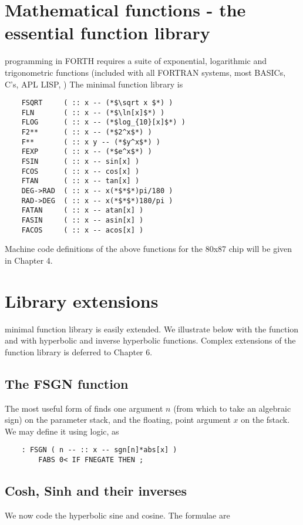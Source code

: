 \section{Mathematical functions - the essential function library}

programming in FORTH requires a suite of exponential, logarithmic and trigonometric functions (included with all FORTRAN systems, most BASICs, C's, APL LISP, \etc) The minimal function library is

\begin{lstlisting}
    FSQRT     ( :: x -- (*$\sqrt x $*) )
    FLN       ( :: x -- (*$\ln[x]$*) )
    FLOG      ( :: x -- (*$log_{10}[x]$*) )
    F2**      ( :: x -- (*$2^x$*) )
    F**       ( :: x y -- (*$y^x$*) )
    FEXP      ( :: x -- (*$e^x$*) )
    FSIN      ( :: x -- sin[x] )
    FCOS      ( :: x -- cos[x] )
    FTAN      ( :: x -- tan[x] )
    DEG->RAD  ( :: x -- x(*$*$*)pi/180 )
    RAD->DEG  ( :: x -- x(*$*$*)180/pi )
    FATAN     ( :: x -- atan[x] )
    FASIN     ( :: x -- asin[x] )
    FACOS     ( :: x -- acos[x] )
\end{lstlisting}

Machine code definitions of the above functions for the 80x87
chip will be given in Chapter 4.

\section{Library extensions}

minimal function library is easily extended. We illustrate
below with the  function and with hyperbolic and inverse hyperbolic
functions. Complex extensions of the function
library is deferred to Chapter 6.

\subsection{The FSGN function}
The most useful form of  finds one argument $n$ (from which
to take an algebraic sign) on the parameter stack, and the floating,
point argument $x$ on the fstack. We may define it using logic, as

\begin{lstlisting}
    : FSGN ( n -- :: x -- sgn[n]*abs[x] )
        FABS 0< IF FNEGATE THEN ;
\end{lstlisting}

\subsection{Cosh, Sinh and their inverses}
We now code the hyperbolic sine and cosine. The formulae are


